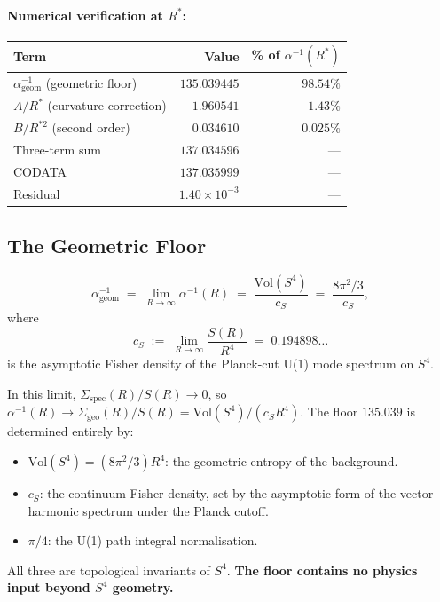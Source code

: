 \documentclass[12pt,a4paper]{article}
\newcommand{\ai}{\alpha^{-1}}
\newcommand{\Sg}{\Sigma_{\mathrm{geo}}}
\newcommand{\Ss}{\Sigma_{\mathrm{spec}}}
\newcommand{\floor}{\ai_{\mathrm{geom}}}
\begin{document}
\paragraph{Numerical verification at $R^*$:}
\begin{center}
\begin{tabular}{lrr}
\toprule
Term & Value & \% of $\ai(R^*)$ \\
\midrule
$\floor$ (geometric floor) & $135.039445$ & $98.54\%$ \\
$A/R^*$ (curvature correction) & $1.960541$ & $1.43\%$ \\
$B/R^{*2}$ (second order) & $0.034610$ & $0.025\%$ \\
\midrule
Three-term sum & $137.034596$ & --- \\
CODATA & $137.035999$ & --- \\
Residual & $1.40\times 10^{-3}$ & --- \\
\bottomrule
\end{tabular}
\end{center}

\subsection{The Geometric Floor}
\label{sec:floor}

\begin{Tbox}
\label{thm:floor}
\begin{equation}
  \floor
  \;=\;
  \lim_{R\to\infty} \ai(R)
  \;=\;
  \frac{\mathrm{Vol}(S^4)}{c_S}
  \;=\;
  \frac{8\pi^2/3}{c_S},
\label{eq:floor}
\end{equation}
where
\begin{equation}
  c_S
  \;:=\;
  \lim_{R\to\infty} \frac{S(R)}{R^4}
  \;=\; 0.194898\ldots
\label{eq:cS}
\end{equation}
is the asymptotic Fisher density of the Planck-cut
U(1) mode spectrum on $S^4$.

In this limit, $\Ss(R)/S(R) \to 0$,
so $\ai(R) \to \Sg(R)/S(R) = \mathrm{Vol}(S^4)/(c_S R^4)$.
The floor $135.039$ is determined entirely by:
\begin{itemize}
  \item $\mathrm{Vol}(S^4) = (8\pi^2/3)R^4$:
    the geometric entropy of the background.
  \item $c_S$: the continuum Fisher density,
    set by the asymptotic form of the vector
    harmonic spectrum under the Planck cutoff.
  \item $\pi/4$: the U(1) path integral normalisation.
\end{itemize}
All three are topological invariants of $S^4$.
\textbf{The floor contains no physics input beyond
$S^4$ geometry.}
\end{Tbox}
\end{document}
